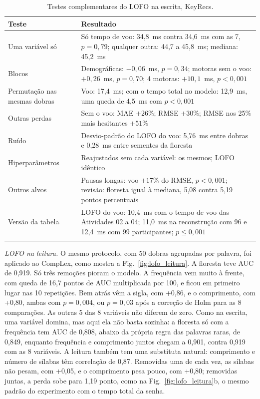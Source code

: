 \documentclass[conference]{IEEEtran}
\begin{document}
\begin{table}[!t]
\caption{Testes complementares do LOFO na escrita, KeyRecs.}
\label{tab:complementares}
\centering
\footnotesize
\setlength{\tabcolsep}{4pt}
\renewcommand{\arraystretch}{1.1}
\begin{tabular}{@{}>{\raggedright\arraybackslash}p{2.05cm}
                >{\raggedright\arraybackslash}p{6.15cm}@{}}
\toprule
\textbf{Teste} & \textbf{Resultado} \\
\midrule
Uma variável só      & Só tempo de voo: 34,8~ms contra 34,6~ms com as 7, $p = 0,79$; qualquer outra: 44,7 a 45,8~ms; mediana: 45,2~ms \\
Blocos               & Demográficas: $-0,06$~ms, $p = 0,34$; motoras sem o voo: $+0,26$~ms, $p = 0,70$; 4 motoras: $+10,1$~ms, $p < 0,001$ \\
Permutação nas mesmas dobras & Voo: 17,4~ms; com o tempo total no modelo: 12,9~ms, uma queda de 4,5~ms com $p < 0,001$ \\
Outras perdas        & Sem o voo: MAE $+26\%$; RMSE $+30\%$; RMSE nos 25\% mais hesitantes $+51\%$ \\
Ruído                & Desvio-padrão do LOFO do voo: 5,76~ms entre dobras e 0,28~ms entre sementes da floresta \\
Hiperparâmetros      & Reajustados sem cada variável: os mesmos; LOFO idêntico \\
Outros alvos         & Pausas longas: voo $+17\%$ do RMSE, $p < 0,001$; revisão: floresta igual à mediana, 5,08 contra 5,19 pontos percentuais \\
Versão da tabela     & LOFO do voo: 10,4~ms com o tempo de voo das Atividades 02 a 04; 11,0~ms na reconstrução com 96 e 12,4~ms com 99 participantes; $p \le 0,001$ \\
\bottomrule
\multicolumn{2}{@{}p{0.97\columnwidth}@{}}{\scriptsize Mesmas 50 dobras e
hiperparâmetros do LOFO principal; $p$ pelo teste $t$
corrigido~\cite{nadeau2003inference}.}
\end{tabular}
\end{table}

\emph{LOFO na leitura.} O mesmo protocolo, com 50 dobras agrupadas por palavra,
foi aplicado ao CompLex, como mostra a Fig.~\ref{fig:lofo_leitura}. A floresta
teve AUC de 0,919. Só três remoções pioram o modelo. A frequência vem muito à
frente, com queda de 16,7 pontos de AUC multiplicada por 100, e ficou em
primeiro lugar nas 10 repetições. Bem atrás vêm a sigla, com +0,86, e o
comprimento, com +0,80, ambas com $p = 0,004$, ou $p = 0,03$ após a correção de
Holm para as 8 comparações. As outras 5 das 8 variáveis não diferem de zero.
Como na escrita, uma variável domina, mas aqui ela não basta sozinha: a
floresta só com a frequência tem AUC de 0,808, abaixo da própria regra das
palavras raras, de 0,849, enquanto frequência e comprimento juntos chegam a
0,901, contra 0,919 com as 8 variáveis. A leitura também tem uma substituta
natural: comprimento e número de sílabas têm correlação de 0,87. Removidas uma
de cada vez, as sílabas não pesam, com +0,05, e o comprimento pesa pouco, com
+0,80; removidas juntas, a perda sobe para 1,19 ponto, como na
Fig.~\ref{fig:lofo_leitura}b, o mesmo padrão do experimento com o tempo total
da senha.
\end{document}
